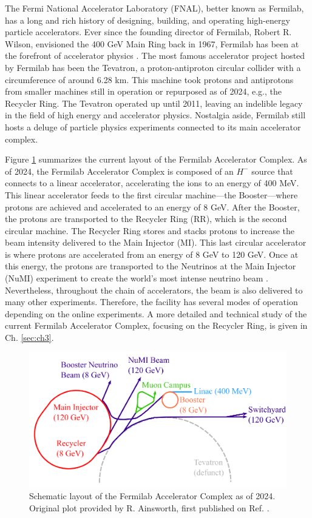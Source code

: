 The Fermi National Accelerator Laboratory (FNAL), better known as Fermilab, has a long and rich history of designing, building, and operating high-energy particle accelerators. Ever since the founding director of Fermilab, Robert R. Wilson, envisioned the 400 GeV Main Ring back in 1967, Fermilab has been at the forefront of accelerator physics \cite{fermilab1,fermi50,tevatron}. The most famous accelerator project hosted by Fermilab has been the Tevatron, a proton-antiproton circular collider with a circumference of around 6.28 km. This machine took protons and antiprotons from smaller machines still in operation or repurposed as of 2024, e.g., the Recycler Ring. The Tevatron operated up until 2011, leaving an indelible legacy in the field of high energy and accelerator physics. Nostalgia aside, Fermilab still hosts a deluge of particle physics experiments connected to its main accelerator complex.      

Figure \ref{fig:fac} summarizes the current layout of the Fermilab Accelerator Complex. As of 2024, the Fermilab Accelerator Complex is composed of an $H^-$ source that connects to a linear accelerator, accelerating the ions to an energy of 400 MeV. This linear accelerator feeds to the first circular machine---the Booster---where protons are achieved and accelerated to an energy of 8 GeV. After the Booster, the protons are transported to the Recycler Ring (RR), which is the second circular machine. The Recycler Ring stores and stacks protons to increase the beam intensity delivered to the Main Injector (MI). This last circular accelerator is where protons are accelerated from an energy of 8 GeV to 120 GeV. Once at this energy, the protons are transported to the Neutrinos at the Main Injector (NuMI) experiment to create the world's most intense neutrino beam \cite{numi1}. Nevertheless, throughout the chain of accelerators, the beam is also delivered to many other experiments. Therefore, the facility has several modes of operation depending on the online experiments. A more detailed and technical study of the current Fermilab Accelerator Complex, focusing on the Recycler Ring, is given in Ch. \ref{sec:ch3}.   

\begin{figure}[H]
    \centering
    \includegraphics[width=\columnwidth]{chapter1/complex.png}
    \caption{Schematic layout of the Fermilab Accelerator Complex as of 2024. Original plot provided by R. Ainsworth, first published on Ref. \cite{rr1}.}
    \label{fig:fac}
 \end{figure}

